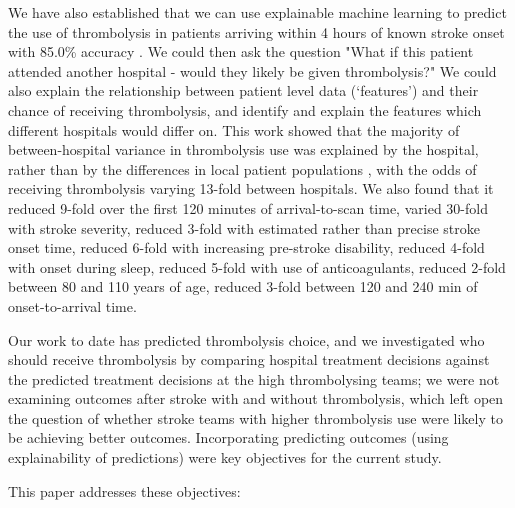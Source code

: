 We have also established that we can use explainable machine learning to predict the use of thrombolysis in patients arriving within 4 hours of known stroke onset with 85.0\% accuracy \cite{pearn_what_2023}. We could then ask the question "What if this patient attended another hospital - would they likely be given thrombolysis?" We could also explain the relationship between patient level data (`features') and their chance of receiving thrombolysis, and identify and explain the features which different hospitals would differ on. This work showed that the majority of between-hospital variance in thrombolysis use was explained by the hospital, rather than by the differences in local patient populations \cite{pearn_what_2023}, with the odds of receiving thrombolysis varying 13-fold between hospitals. We also found that it reduced 9-fold over the first 120 minutes of arrival-to-scan time, varied 30-fold with stroke severity, reduced 3-fold with estimated rather than precise stroke onset time, reduced 6-fold with increasing pre-stroke disability, reduced 4-fold with onset during sleep, reduced 5-fold with use of anticoagulants, reduced 2-fold between 80 and 110 years of age, reduced 3-fold between 120 and 240 min of onset-to-arrival time.


Our work to date has predicted thrombolysis choice, and we investigated who should receive thrombolysis by comparing hospital treatment decisions against the predicted treatment decisions at the high thrombolysing teams; we were not examining outcomes after stroke with and without thrombolysis, which left open the question of whether stroke teams with higher thrombolysis use were likely to be achieving better outcomes. Incorporating predicting outcomes (using explainability of predictions) were key objectives for the current study.

This paper addresses these objectives:

